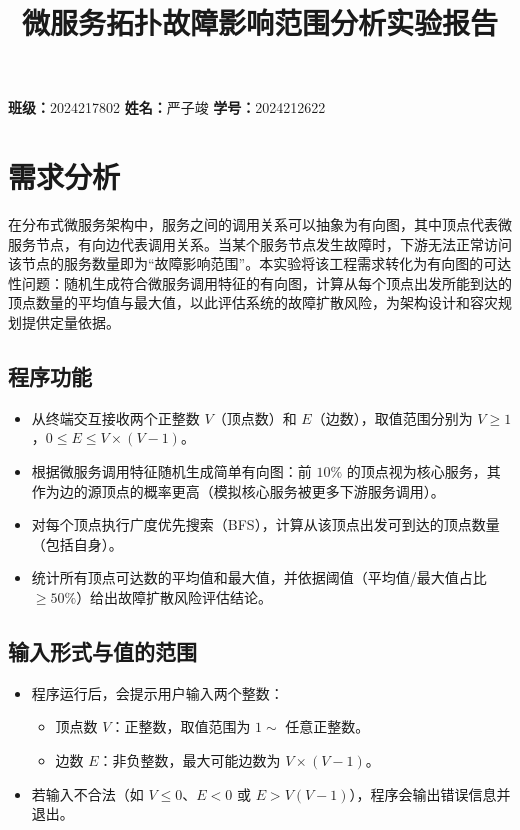 \documentclass[UTF8]{ctexart}
\title{微服务拓扑故障影响范围分析实验报告}
\author{}
\begin{document}
\maketitle

\begin{center}
    \textbf{班级：}2024217802 \quad \textbf{姓名：}严子竣 \quad \textbf{学号：}2024212622
\end{center}

\section{需求分析}

在分布式微服务架构中，服务之间的调用关系可以抽象为有向图，其中顶点代表微服务节点，有向边代表调用关系。当某个服务节点发生故障时，下游无法正常访问该节点的服务数量即为“故障影响范围”。本实验将该工程需求转化为有向图的可达性问题：随机生成符合微服务调用特征的有向图，计算从每个顶点出发所能到达的顶点数量的平均值与最大值，以此评估系统的故障扩散风险，为架构设计和容灾规划提供定量依据。

\subsection{程序功能}
\begin{itemize}
    \item 从终端交互接收两个正整数 \(V\)（顶点数）和 \(E\)（边数），取值范围分别为 \(V \geq 1\)，\(0 \leq E \leq V \times (V-1)\)。
    \item 根据微服务调用特征随机生成简单有向图：前 \(10\%\) 的顶点视为核心服务，其作为边的源顶点的概率更高（模拟核心服务被更多下游服务调用）。
    \item 对每个顶点执行广度优先搜索（BFS），计算从该顶点出发可到达的顶点数量（包括自身）。
    \item 统计所有顶点可达数的平均值和最大值，并依据阈值（平均值/最大值占比 \(\geq 50\%\)）给出故障扩散风险评估结论。
\end{itemize}

\subsection{输入形式与值的范围}
\begin{itemize}
    \item 程序运行后，会提示用户输入两个整数：
        \begin{itemize}
            \item 顶点数 \(V\)：正整数，取值范围为 \(1 \sim\) 任意正整数。
            \item 边数 \(E\)：非负整数，最大可能边数为 \(V \times (V-1)\)。
        \end{itemize}
    \item 若输入不合法（如 \(V \leq 0\)、\(E < 0\) 或 \(E > V(V-1)\)），程序会输出错误信息并退出。
\end{itemize}
\end{document}
